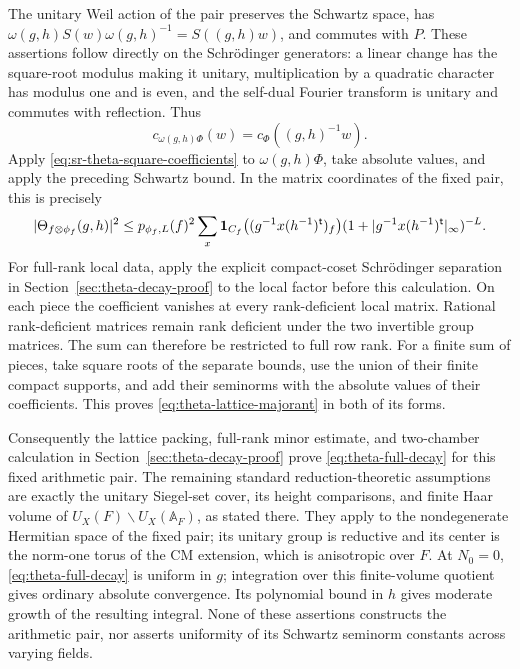 The unitary Weil action of the pair preserves the Schwartz space,
has
\(\omega(g,h)S(w)\omega(g,h)^{-1}=S((g,h)w)\), and commutes with
\(P\).  These assertions follow directly on the Schr\"odinger
generators: a linear change has the square-root modulus making it
unitary, multiplication by a quadratic character has modulus one
and is even, and the self-dual Fourier transform is unitary and
commutes with reflection.  Thus
\[
 c_{\omega(g,h)\Phi}(w)=c_\Phi((g,h)^{-1}w).
\]
Apply \eqref{eq:sr-theta-square-coefficients} to
\(\omega(g,h)\Phi\), take absolute values, and apply the preceding
Schwartz bound.  In the matrix coordinates of the fixed pair,
this is precisely
\[
 |\Theta_{f\otimes\phi_f}(g,h)|^2
 \le p_{\phi_f,L}(f)^2
     \sum_{x}
       {\bf1}_{C_f}\bigl((g^{-1}x(h^{-1})^{\mathsf t})_f\bigr)
       (1+|g^{-1}x(h^{-1})^{\mathsf t}|_\infty)^{-L}.
\]
For full-rank local data, apply the explicit compact-coset
Schr\"odinger separation in
Section~\ref{sec:theta-decay-proof} to the local factor before
this calculation.  On each piece the coefficient vanishes at
every rank-deficient local matrix.  Rational rank-deficient
matrices remain rank deficient under the two invertible group
matrices.  The sum can therefore be restricted to full row rank.
For a finite sum of pieces, take square roots of the separate
bounds, use the union of their finite compact supports, and add
their seminorms with the absolute values of their coefficients.
This proves \eqref{eq:theta-lattice-majorant} in both of its forms.

Consequently the lattice packing, full-rank minor estimate, and
two-chamber calculation in
Section~\ref{sec:theta-decay-proof} prove
\eqref{eq:theta-full-decay} for this fixed arithmetic pair.
The remaining standard reduction-theoretic assumptions are exactly
the unitary Siegel-set cover, its height comparisons, and finite
Haar volume of \(U_X(F)\backslash U_X(\mathbb A_F)\), as stated
there.  They apply to the nondegenerate Hermitian space of the
fixed pair; its unitary group is reductive and its center is the
norm-one torus of the CM extension, which is anisotropic over
\(F\).  At \(N_0=0\), \eqref{eq:theta-full-decay} is uniform in
\(g\); integration over this finite-volume quotient gives ordinary
absolute convergence.  Its polynomial bound in \(h\) gives moderate
growth of the resulting integral.  None of these assertions
constructs the arithmetic pair, nor asserts uniformity of its
Schwartz seminorm constants across varying fields.

